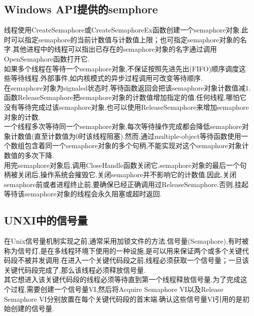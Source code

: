 \documentclass[a4paper,12pt,notitlepage]{article}
\begin{document}
\subsection{Windows API提供的semphore}

	线程使用CreateSemaphore或CreateSemaphoreEx函数创建一个semaphore对象.此时可以指定semaphore的当前计数值与计数值上限；也可指定semaphore对象的名字.其他进程中的线程可以指出已存在的semaphore对象的名字通过调用OpenSemaphore函数打开它.\\
	
	如果多个线程在等待一个semaphore对象,不保证按照先进先出(FIFO)顺序调度这些等待线程.外部事件,如内核模式的异步过程调用可改变等待顺序.\\

	在semaphore对象为signaled状态时,等待函数返回会把该semaphore对象计数值减1.函数ReleaseSemaphore把semaphore对象的计数值增加指定的值.任何线程,哪怕它没有等待完成过该semaphore对象,也可以使用ReleaseSemaphore来增加semaphore对象的计数.\\

	一个线程多次等待同一个semaphore对象,每次等待操作完成都会降低semaphore对象计数值(直至计数值为0时该线程阻塞).然而,通过multiple-object等待函数使用一个数组包含着同一个semaphore对象的多个句柄,不能实现对这个semaphore对象计数值的多次下降.\\

	用完semaphore对象后,调用CloseHandle函数关闭它.semaphore对象的最后一个句柄被关闭后,操作系统会摧毁它.关闭semaphore并不影响它的计数值.因此,关闭semaphore前或者进程终止前,要确保已经正确调用过ReleaseSemaphore.否则,挂起等待该semaphore对象的线程会永久阻塞或超时返回.\\
	
\subsection{UNXI中的信号量}

	在Unix信号量机制实现之前,通常采用加锁文件的方法.信号量(Semaphore),有时被称为信号灯,是在多线程环境下使用的一种设施,是可以用来保证两个或多个关键代码段不被并发调用.在进入一个关键代码段之前,线程必须获取一个信号量；一旦该关键代码段完成了,那么该线程必须释放信号量.\\

	其它想进入该关键代码段的线程必须等待直到第一个线程释放信号量.为了完成这个过程,需要创建一个信号量VI,然后将Acquire Semaphore VI以及Release Semaphore VI分别放置在每个关键代码段的首末端.确认这些信号量VI引用的是初始创建的信号量.\\
\end{document}
